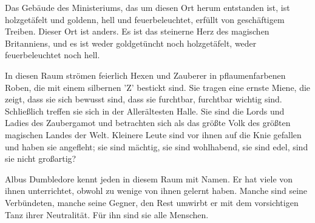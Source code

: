 Das Gebäude des Ministeriums, das um diesen Ort herum entstanden ist, ist holzgetäfelt und goldenn, hell und feuerbeleuchtet, erfüllt von geschäftigem Treiben. Dieser Ort ist anders. Es ist das steinerne Herz des magischen Britanniens, und es ist weder goldgetüncht noch holzgetäfelt, weder feuerbeleuchtet noch hell.

In diesen Raum strömen feierlich Hexen und Zauberer in pflaumenfarbenen Roben, die mit einem silbernen 'Z' bestickt sind. Sie tragen eine ernste Miene, die zeigt, dass sie sich bewusst sind, dass sie furchtbar, furchtbar wichtig sind. Schließlich treffen sie sich in der Allerältesten Halle. Sie sind die Lords und Ladies des Zaubergamot und betrachten sich als das größte Volk des größten magischen Landes der Welt. Kleinere Leute sind vor ihnen auf die Knie gefallen und haben sie angefleht; sie sind mächtig, sie sind wohlhabend, sie sind edel, sind sie nicht großartig?

Albus Dumbledore kennt jeden in diesem Raum mit Namen. Er hat viele von ihnen unterrichtet, obwohl zu wenige von ihnen gelernt haben. Manche sind seine Verbündeten, manche seine Gegner, den Rest umwirbt er mit dem vorsichtigen Tanz ihrer Neutralität. Für ihn sind sie alle Menschen.


